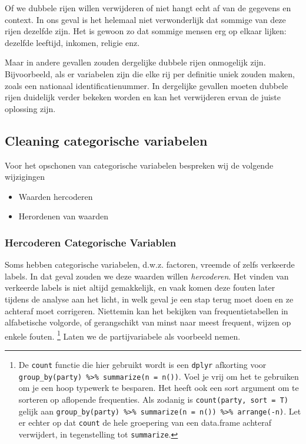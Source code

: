 \documentclass[]{tufte-book}
\providecommand{\tightlist}{%
  \setlength{\itemsep}{0pt}\setlength{\parskip}{0pt}}
\begin{document}
Of we dubbele rijen willen verwijderen of niet hangt echt af van de gegevens en context. In ons geval is het helemaal niet verwonderlijk dat sommige van deze rijen dezelfde zijn. Het is gewoon zo dat sommige mensen erg op elkaar lijken: dezelfde leeftijd, inkomen, religie enz.

Maar in andere gevallen zouden dergelijke dubbele rijen onmogelijk zijn. Bijvoorbeeld, als er variabelen zijn die elke rij per definitie uniek zouden maken, zoals een nationaal identificatienummer. In dergelijke gevallen moeten dubbele rijen duidelijk verder bekeken worden en kan het verwijderen ervan de juiste oplossing zijn.

\hypertarget{cleaning-categorische-variabelen}{%
\subsection{Cleaning categorische variabelen}\label{cleaning-categorische-variabelen}}

Voor het opschonen van categorische variabelen bespreken wij de volgende wijzigingen

\begin{itemize}
\tightlist
\item
  Waarden hercoderen
\item
  Herordenen van waarden
\end{itemize}

\hypertarget{hercoderen-categorische-variablen}{%
\subsubsection{Hercoderen Categorische Variablen}\label{hercoderen-categorische-variablen}}

Soms hebben categorische variabelen, d.w.z. factoren, vreemde of zelfs verkeerde labels. In dat geval zouden we deze waarden willen \emph{hercoderen}. Het vinden van verkeerde labels is niet altijd gemakkelijk, en vaak komen deze fouten later tijdens de analyse aan het licht, in welk geval je een stap terug moet doen en ze achteraf moet corrigeren. Niettemin kan het bekijken van frequentietabellen in alfabetische volgorde, of gerangschikt van minst naar meest frequent, wijzen op enkele fouten. \footnote{De \texttt{count} functie die hier gebruikt wordt is een \texttt{dplyr} afkorting voor \texttt{group\_by(party)\ \%\textgreater{}\%\ summarize(n\ =\ n())}. Voel je vrij om het te gebruiken om je een hoop typewerk te besparen. Het heeft ook een sort argument om te sorteren op aflopende frequenties. Als zodanig is \texttt{count(party,\ sort\ =\ T)} gelijk aan \texttt{group\_by(party)\ \%\textgreater{}\%\ summarize(n\ =\ n())\ \%\textgreater{}\%\ arrange(-n)}. Let er echter op dat \texttt{count} de hele groepering van een data.frame achteraf verwijdert, in tegenstelling tot \texttt{summarize}.} Laten we de partijvariabele als voorbeeld nemen.
\end{document}

